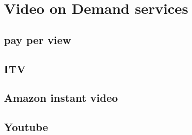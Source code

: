\section{Video on Demand services}

\subsection{pay per view}
\subsection{ITV}
\subsection{Amazon instant video}
\subsection{Youtube}